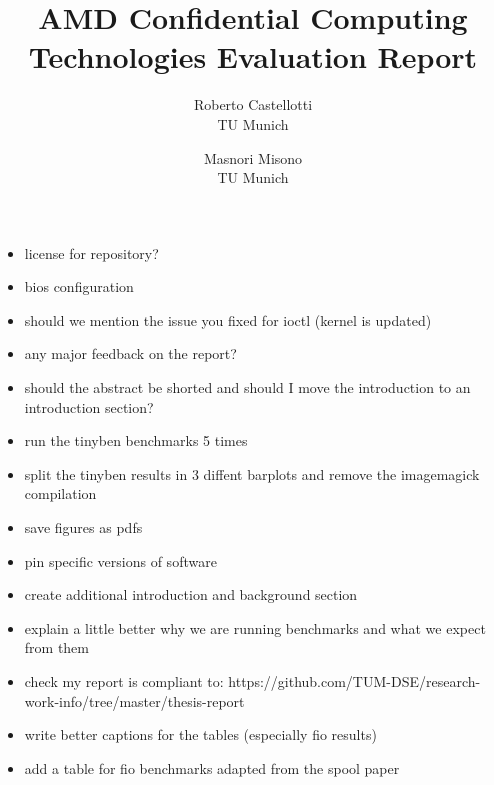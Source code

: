 \documentclass[twocolumn]{article}
\begin{document}
\date{}
\title{\Large \bf AMD Confidential Computing Technologies Evaluation Report}
\author{{\rm Roberto Castellotti}\\TU Munich \and {\rm Masnori Misono}\\TU Munich}
\maketitle

\begin{itemize}
    \item license for repository?
    \item bios configuration
    \item should we mention the issue you fixed for ioctl (kernel is updated)
    \item any major feedback on the report?
    \item should the abstract be shorted and should I move the introduction to an introduction section?
    \item run the tinyben benchmarks 5 times
    \item split the tinyben results in 3 diffent barplots and remove the imagemagick compilation
    \item save figures as pdfs
    \item pin specific versions of software
    \item create additional introduction and background section
    \item explain a little better why we are running benchmarks and what we expect from them
    \item check my report is compliant to: https://github.com/TUM-DSE/research-work-info/tree/master/thesis-report
    \item write better captions for the tables (especially fio results)
    \item add a table for fio benchmarks adapted from the spool paper
\end{itemize}
\end{document}
